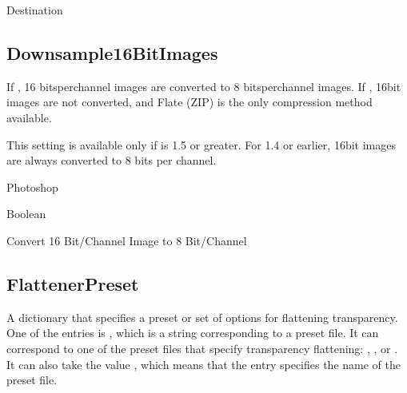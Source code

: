 \documentclass[letterpaper,12pt,english,openany,oneside]{sphinxmanual}
\begin{document}
Destination

\label{\detokenize{PDF_Create_NewNamespaces:default-value-7}}

\begin{sphinxVerbatim}[commandchars=\\\{\}]
\end{sphinxVerbatim}




\subsection{Downsample16BitImages}
\label{\detokenize{PDF_Create_NewNamespaces:downsample16bitimages}}
If  , 16 bits\sphinxhyphen{}per\sphinxhyphen{}channel images are converted to 8 bits\sphinxhyphen{}per\sphinxhyphen{}channel images. If  , 16\sphinxhyphen{}bit images are not converted, and Flate (ZIP) is the only compression method available.

This setting is available only if  is 1.5 or greater. For 1.4 or earlier, 16\sphinxhyphen{}bit images are always converted to 8 bits per channel.

\label{\detokenize{PDF_Create_NewNamespaces:supported-by-9}}

Photoshop

\label{\detokenize{PDF_Create_NewNamespaces:type-9}}

Boolean

\label{\detokenize{PDF_Create_NewNamespaces:ui-name-9}}

Convert 16 Bit/Channel Image to 8 Bit/Channel

\label{\detokenize{PDF_Create_NewNamespaces:default-value-8}}

\begin{sphinxVerbatim}[commandchars=\\\{\}]
\end{sphinxVerbatim}


\subsection{FlattenerPreset}
\label{\detokenize{PDF_Create_NewNamespaces:flattenerpreset}}
A dictionary that specifies a preset or set of options for flattening transparency. One of the entries is  , which is a string corresponding to a preset file. It can correspond to one of the preset files that specify transparency flattening:  ,  , or  . It can also take the value  , which means that the  entry specifies the name of the preset file.
\end{document}
